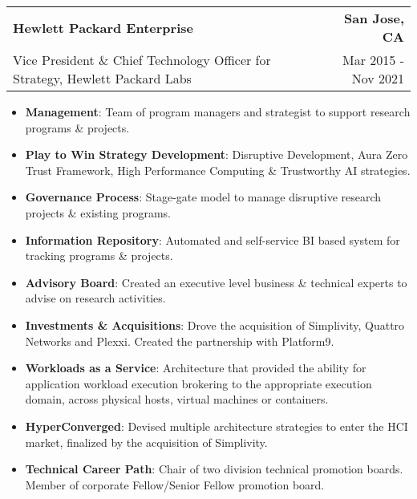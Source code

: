 \documentclass[letterpaper,11pt]{article}
\makeatletter
\newcommand{\resumeCompanyHeading}[4]{
  \vspace{-1pt}
    \item
    \begin{tabular*}{1.0\textwidth}[t]{l@{\extracolsep{\fill}}r}
      \textbf{#1} & \textbf{#2} \\
      {#3} & {#4}
    \end{tabular*}\vspace{-10pt}
  }
\newcommand{\resumeItem}[2]{\item{{\textbf{\small#1}}: {\small#2 \vspace{-1pt}}}}
\newcommand{\resumeItemListStart}{\begin{itemize}}
\newcommand{\resumeItemListEnd}{\end{itemize}}\vspace{-10pt}
\makeatother
\begin{document}
      \resumeCompanyHeading
          {Hewlett Packard Enterprise}
          {San Jose, CA}
          {Vice President \& Chief Technology Officer for Strategy, Hewlett Packard Labs}
          {Mar 2015 - Nov 2021}
            \resumeItemListStart
                \resumeItem{Management}{Team of program managers and strategist to support research programs \& projects.}
                \resumeItem{Play to Win Strategy Development}{Disruptive Development, Aura Zero Trust Framework, High Performance Computing \& Trustworthy AI strategies.}
                \resumeItem{Governance Process}{Stage-gate model to manage  disruptive research projects \& existing programs.}
                \resumeItem{Information Repository}{Automated and self-service BI based system for tracking programs \& projects.}
                \resumeItem{Advisory Board}{Created an executive level business \& technical experts to advise on research activities.}
                \resumeItem{Investments \& Acquisitions}{Drove the acquisition of Simplivity, Quattro Networks and Plexxi.  Created the partnership with Platform9.}
                \resumeItem{Workloads as a Service}{Architecture that provided the ability for application workload execution brokering to the appropriate execution domain, across 
                           physical hosts, virtual machines or containers.}
                \resumeItem{HyperConverged}{Devised multiple architecture strategies to enter the HCI market, finalized by the acquisition of Simplivity.}
                \resumeItem{Technical Career Path}{Chair of two division technical promotion boards.  Member of corporate Fellow/Senior Fellow promotion board.}
            \resumeItemListEnd
\end{document}
